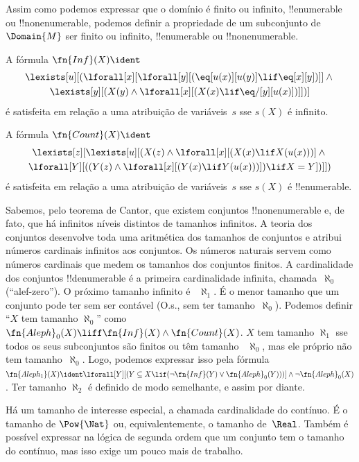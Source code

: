 \documentclass[../../../include/open-logic-section]{subfiles}
\begin{document}


\begin{explain}
Assim como podemos expressar que o domínio é finito ou infinito,
!!{enumerable} ou !!{nonenumerable}, podemos definir a propriedade de um
subconjunto de~$\Domain{M}$ ser finito ou infinito, !!{enumerable} ou
!!{nonenumerable}.
\end{explain}

\begin{prop}
A fórmula $\fn{Inf}(X) \ident$
\begin{multline*}
\lexists[u][(\lforall[x][\lforall[y][(\eq[u(x)][u(y)] \lif 
      \eq[x][y])]] \land {} \\\lexists[y][(X(y) \land \lforall[x][(X(x)
      \lif \eq/[y][u(x)])]])]
\end{multline*}
é satisfeita em relação a uma atribuição de variáveis~$s$ sse $s(X)$ é
infinito.
\end{prop}

\begin{prop}
A fórmula $\fn{Count}(X) \ident $
\begin{multline*}
\lexists[z][\lexists[u][(X(z) \land 
    \lforall[x][(X(x) \lif X(u(x)))] \land {} \\ \lforall[Y][((Y(z) \land
      \lforall[x][(Y(x) \lif Y(u(x)))]) \lif X = Y])]])
\end{multline*}
é satisfeita em relação a uma atribuição de variáveis~$s$ sse $s(X)$ é
!!{enumerable}.
\end{prop}

Sabemos, pelo teorema de Cantor, que existem conjuntos !!{nonenumerable} e,
de fato, que há infinitos níveis distintos de tamanhos infinitos. A teoria
dos conjuntos desenvolve toda uma aritmética dos tamanhos de conjuntos e
atribui números cardinais infinitos aos conjuntos. Os números naturais
servem como números cardinais que medem os tamanhos dos conjuntos finitos. A
cardinalidade dos conjuntos !!{denumerable} é a primeira cardinalidade
infinita, chamada~$\aleph_0$ (``alef-zero''). O próximo tamanho infinito é
~$\aleph_1$. É o menor tamanho que um conjunto pode ter sem ser contável
(O.s.\@, sem ter tamanho~$\aleph_0$). Podemos definir ``$X$ tem tamanho
$\aleph_0$'' como
$\fn{Aleph}_0(X) \liff \fn{Inf}(X) \land \fn{Count}(X)$. $X$ tem tamanho
$\aleph_1$ sse todos os seus subconjuntos são finitos ou têm tamanho
~$\aleph_0$, mas ele próprio não tem tamanho~$\aleph_0$. Logo, podemos
expressar isso pela fórmula $\fn{Aleph_1}(X) \ident
\lforall[Y][(Y \subseteq X \lif
  (\lnot\fn{Inf}(Y) \lor \fn{Aleph}_0(Y)))] \land \lnot
\fn{Aleph}_0(X)$. Ter tamanho $\aleph_2$ é definido de modo semelhante, e
assim por diante.

Há um tamanho de interesse especial, a chamada cardinalidade do contínuo.
É o tamanho de $\Pow{\Nat}$ ou, equivalentemente, o tamanho de~$\Real$.
Também é possível expressar na lógica de segunda ordem que um conjunto tem
o tamanho do contínuo, mas isso exige um pouco mais de trabalho.
\end{document}
